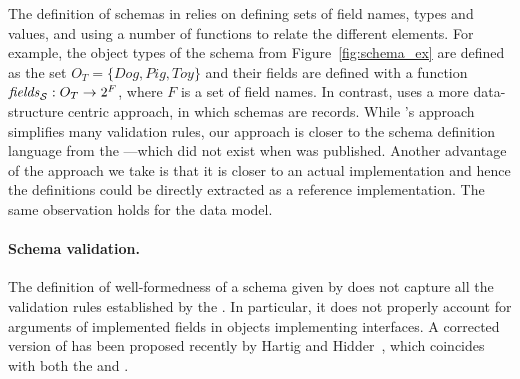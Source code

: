 The definition of schemas in \HP relies on defining sets of field names, types and values, and using a number of functions to relate the different elements.
For example, the object types of the schema from Figure~\ref{fig:schema_ex} are defined as the set $O_{T} = \{\mathit{Dog, Pig, Toy\}}$ and their fields are defined with a
function $\mathit{fields}_{\mathcal{S}} : O_{T} \to 2^{F}$, where $F$ is a set of field names.
In contrast, \gcoql uses a more data-structure centric approach, in which schemas are records.
While \HP's approach simplifies many validation rules, our approach is closer to the schema definition language from the \spec---which did not exist when \HP was published. 
Another advantage of the approach we take is that it is closer to an actual implementation
and hence the definitions could be directly extracted as a reference implementation. The same observation holds for the data model.



\paragraph{Schema validation.} The definition of well-formedness
of a schema given by \HP does not capture all the validation rules established by the \spec. In particular, it does not properly account for arguments of implemented fields in objects implementing interfaces. A corrected version of \HP has been proposed recently by Hartig and Hidder~\cite{olafschema}, which coincides with both the \spec and \gcoql. 


